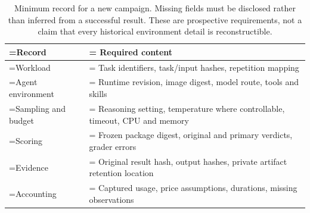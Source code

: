 \begin{table}[!htbp]
\centering\small
\setlength{\tabcolsep}{4pt}
\begin{tabularx}{\linewidth}{@{}>{\hsize=0.54\hsize\linewidth=\hsize\RaggedRight\arraybackslash}X>{\hsize=1.46\hsize\linewidth=\hsize\RaggedRight\arraybackslash}X@{}}
\toprule
\textbf{Record} & \textbf{Required content} \\
\midrule
Workload & Task identifiers, task/input hashes, repetition mapping \\
Agent environment & Runtime revision, image digest, model route, tools and skills \\
Sampling and budget & Reasoning setting, temperature where controllable, timeout, CPU and memory \\
Scoring & Frozen package digest, original and primary verdicts, grader errors \\
Evidence & Original result hash, output hashes, private artifact retention location \\
Accounting & Captured usage, price assumptions, durations, missing observations \\
\bottomrule
\end{tabularx}
\caption{Minimum record for a new campaign. Missing fields must be disclosed rather than inferred from a successful result. These are prospective requirements, not a claim that every historical environment detail is reconstructible.}
\label{tab:9}
\end{table}
